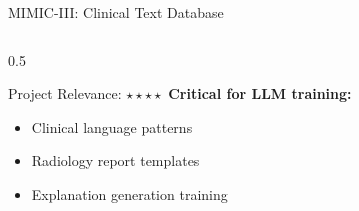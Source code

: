 \documentclass[aspectratio=169]{beamer}
\begin{document}
\begin{frame}{MIMIC-III: Clinical Text Database}
\begin{columns}
\begin{column}{0.5\textwidth}
            \begin{alertblock}{Project Relevance: $\star\star\star\star$}
                \textbf{Critical for LLM training:}
                \begin{itemize}
                    \item Clinical language patterns
                    \item Radiology report templates
                    \item Explanation generation training
                \end{itemize}
            \end{alertblock}
        \end{column}
    \end{columns}
\end{frame}
\end{document}
